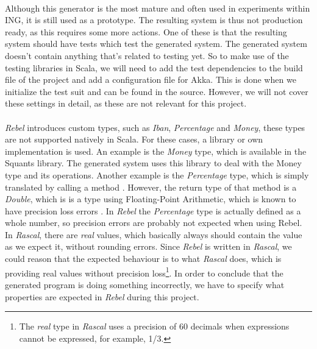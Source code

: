 \\
Although this generator is the most mature and often used in experiments within ING, it is still used as a prototype. The resulting system is thus not production ready, as this requires some more actions. One of these is that the resulting system should have tests which test the generated system. The generated system doesn't contain anything that's related to testing yet. So to make use of the testing libraries in Scala, we will need to add the test dependencies to the build file of the project and add a configuration file for Akka. This is done when we initialize the test suit and can be found in the source. However, we will not cover these settings in detail, as these are not relevant for this project.\\
\\
\textit{Rebel} introduces custom types, such as \textit{Iban}, \textit{Percentage} and \textit{Money}, these types are not supported natively in Scala. For these cases, a library or own implementation is used. An example is the \textit{Money} type, which is available in the Squants \cite{siteSquants2017} library. The generated system uses this library to deal with the Money type and its operations. Another example is the \textit{Percentage} type, which is simply translated by calling a method . However, the return type of that method is a \textit{Double}, which is is a type using Floating-Point Arithmetic, which is known to have precision loss errors \cite{goldberg1991every}. In \textit{Rebel} the \textit{Percentage} type is actually defined as a whole number, so precision errors are probably not expected when using Rebel. In \textit{Rascal}, there are \textit{real} values, which basically always should contain the value as we expect it, without rounding errors. Since \textit{Rebel} is written in \textit{Rascal}, we could reason that the expected behaviour is to what \textit{Rascal} does, which is providing real values without precision loss\footnote{The \textit{real} type in \textit{Rascal} uses a precision of 60 decimals when expressions cannot be expressed, for example, 1/3.}. In order to conclude that the generated program is doing something incorrectly, we have to specify what properties are expected in \textit{Rebel} during this project.


